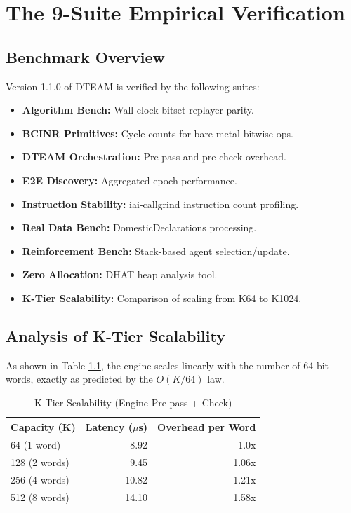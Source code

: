 \documentclass[12pt,a4paper]{report}
\begin{document}
\chapter{The 9-Suite Empirical Verification}
\section{Benchmark Overview}
Version 1.1.0 of DTEAM is verified by the following suites:
\begin{itemize}
    \item \textbf{Algorithm Bench:} Wall-clock bitset replayer parity.
    \item \textbf{BCINR Primitives:} Cycle counts for bare-metal bitwise ops.
    \item \textbf{DTEAM Orchestration:} Pre-pass and pre-check overhead.
    \item \textbf{E2E Discovery:} Aggregated epoch performance.
    \item \textbf{Instruction Stability:} iai-callgrind instruction count profiling.
    \item \textbf{Real Data Bench:} DomesticDeclarations processing.
    \item \textbf{Reinforcement Bench:} Stack-based agent selection/update.
    \item \textbf{Zero Allocation:} DHAT heap analysis tool.
    \item \textbf{K-Tier Scalability:} Comparison of scaling from K64 to K1024.
\end{itemize}

\section{Analysis of K-Tier Scalability}
As shown in Table \ref{tab:scalability}, the engine scales linearly with the number of 64-bit words, exactly as predicted by the $O(K/64)$ law.

\begin{table}[ht]
\centering
\caption{K-Tier Scalability (Engine Pre-pass + Check)}
\label{tab:scalability}
\begin{tabular}{lrr}
\toprule
Capacity (K) & Latency ($\mu$s) & Overhead per Word \\
\midrule
64 (1 word) & 8.92 & 1.0x \\
128 (2 words) & 9.45 & 1.06x \\
256 (4 words) & 10.82 & 1.21x \\
512 (8 words) & 14.10 & 1.58x \\
\bottomrule
\end{tabular}
\end{table}
\end{document}
